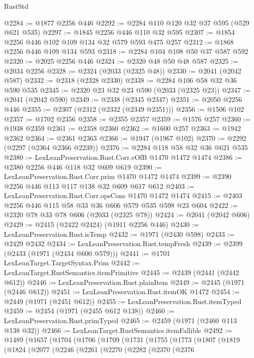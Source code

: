 \begin{lexlean}{RustStd}
\begin{coremodule}
{\begin{coremodule}
{{{{{{{{{{{{{@2284 := @1877 @2256 @446
@2292 := @2284 @110 @120 @32 @37 @595 (@529 @621 @535)
@2297 := @1845 @2256 @446 @110 @32 @595
@2307 := @1854 @2256 @446 @102 @109 @134 @32 @579 @593 @475 @257
@2312 := @1868 @2256 @446 @109 @134 @593
@2318 := @2284 @104 @108 @50 @37 @587 @592
@2320 := @2025 @2256 @446
@2324 := @2320 @48 @50 @48 @587
@2325 := @2034 @2256
@2328 := @2324 (@2033 (@2325 @48))
@2330 := @2041 (@2042 @587)
@2332 := @2318 (@2328 @2330)
@2338 := @2284 @106 @58 @32 @36 @590 @535
@2345 := @2320 @23 @32 @23 @590 (@2033 (@2325 @23))
@2347 := @2041 (@2042 @590)
@2349 := @2338 (@2345 @2347)
@2351 := @2050 @2256 @446
@2355 := @2307 (@2312 (@2332 (@2349 @2351)))
@2356 := @1506 @102
@2357 := @1702 @2356
@2358 := @2355 @2357
@2359 := @1576 @257
@2360 := @1938 @2359
@2361 := @2358 @2360
@2362 := @1600 @257
@2363 := @1942 @2362
@2364 := @2361 @2363
@2366 := @1947 (@1967 @102)
@2370 := @2292 (@2297 (@2364 @2366 @2239))
@2376 := @2284 @118 @58 @32 @36 @621 @535
@2380 := LexLeanPreservation.Rust.Corr.eOfB @1470 @1472 @1474
@2386 := @2380 @2256 @446 @118 @32 @609 @619
@2390 := LexLeanPreservation.Rust.Corr.prim @1470 @1472 @1474
@2399 := @2390 @2256 @446 @113 @117 @138 @32 @609 @617 @612
@2403 := LexLeanPreservation.Rust.Corr.opsCons @1470 @1472 @1474
@2415 := @2403 @2256 @446 @115 @58 @33 @36 @606 @579 @535 @598 @23 @604
@2422 := @2320 @78 @33 @78 @606 (@2033 (@2325 @78))
@2424 := @2041 (@2042 @606)
@2429 := @2415 (@2422 @2424) (@1911 @2256 @446)
@2430 := LexLeanPreservation.Rust.isTemp
@2432 := @1971 (@2430 @598)
@2433 := @2429 @2432
@2434 := LexLeanPreservation.Rust.tempFresh
@2439 := @2399 (@2433 (@1971 (@2434 @600 @579)))
@2441 := @1701 LexLeanTarget.TargetSyntax.Prim
@2442 := LexLeanTarget.RustSemantics.itemPrimitive
@2445 := @2439 (@2441 (@2442 @612))
@2446 := LexLeanPreservation.Rust.plainItem
@2449 := @2445 (@1971 (@2446 @612))
@2451 := LexLeanPreservation.Rust.itemOK @1472
@2454 := @2449 (@1971 (@2451 @612))
@2455 := LexLeanPreservation.Rust.itemTyped
@2459 := @2454 (@1971 (@2455 @612 @138))
@2460 := LexLeanPreservation.Rust.primTyped
@2465 := @2459 (@1971 (@2460 @113 @138 @32))
@2466 := LexLeanTarget.RustSemantics.itemFallible
@2492 := @1489
    (@1657
      (@1704
        (@1706
          (@1709
            (@1731
              (@1755
                (@1773
                  (@1807
                    (@1819
                      (@1824
                        (@2077
                          (@2246
                            (@2261
                              (@2270
                                (@2282
                                  (@2370
                                    (@2376
}}}}}}}}}}}}}
\end{coremodule}}
\end{coremodule}
\end{lexlean}

